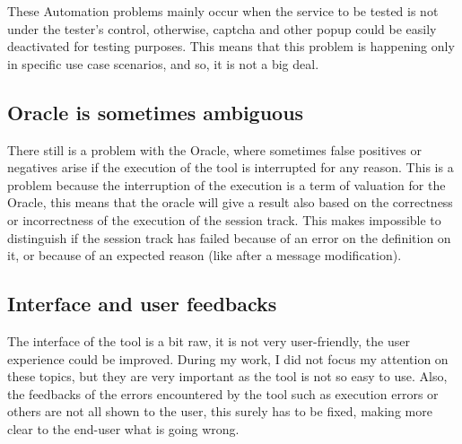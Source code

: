 These Automation problems mainly occur when the service to be tested is not under the tester's control, otherwise, captcha and other popup could be easily deactivated for testing purposes. This means that this problem is happening only in specific use case scenarios, and so, it is not a big deal.

\subsection{Oracle is sometimes ambiguous}
There still is a problem with the Oracle, where sometimes false positives or negatives arise if the execution of the tool is interrupted for any reason. This is a problem because the interruption of the execution is a term of valuation for the Oracle, this means that the oracle will give a result also based on the correctness or incorrectness of the execution of the \gls{session track}. This makes impossible to distinguish if the \gls{session track} has failed because of an error on the definition on it, or because of an expected reason (like after a message modification).

\subsection{Interface and user feedbacks}
The interface of the tool is a bit raw, it is not very user-friendly, the user experience could be improved. During my work, I did not focus my attention on these topics, but they are very important as the tool is not so easy to use. Also, the feedbacks of the errors encountered by the tool such as execution errors or others are not all shown to the user, this surely has to be fixed, making more clear to the end-user what is going wrong.





